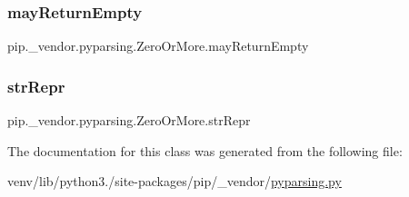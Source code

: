 \subsubsection{\texorpdfstring{may\+Return\+Empty}{mayReturnEmpty}}
{\footnotesize\ttfamily pip.\+\_\+vendor.\+pyparsing.\+Zero\+Or\+More.\+may\+Return\+Empty}

\mbox{\label{classpip_1_1__vendor_1_1pyparsing_1_1ZeroOrMore_afa3e9a7a723041868402257d25ee0f42}} 
\subsubsection{\texorpdfstring{str\+Repr}{strRepr}}
{\footnotesize\ttfamily pip.\+\_\+vendor.\+pyparsing.\+Zero\+Or\+More.\+str\+Repr}



The documentation for this class was generated from the following file\+:\begin{DoxyCompactItemize}
\item 
venv/lib/python3./site-\/packages/pip/\+\_\+vendor/\hyperlink{pip_2__vendor_2pyparsing_8py}{pyparsing.\+py}\end{DoxyCompactItemize}
